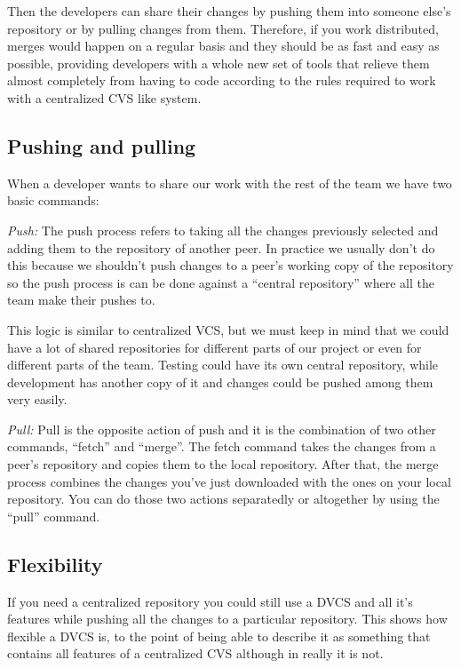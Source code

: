 \documentclass[a4paper,10pt]{article}
\begin{document}
Then the developers can share their changes by pushing them into someone else's repository or by pulling changes from them.
Therefore, if you work distributed, merges would happen on a regular basis and they should be as fast and easy as possible, providing developers with a whole new set of tools that relieve them almost completely from having to code according to the rules required to work with a centralized CVS like system. 

\subsection{Pushing and pulling}
When a developer wants to share our work with the rest of the team we have two basic commands:

\emph{Push:}
The push process refers to taking all the changes previously selected and adding them to the repository of another peer. In practice we usually don't do this because we shouldn't push changes to a peer's working copy of the repository so the push process is can be done against a ``central repository'' where all the team make their pushes to.

This logic is similar to centralized VCS, but we must keep in mind that we could have a lot of shared repositories for different parts of our project or even for different parts of the team. Testing could have its own central repository, while development has another copy of it and changes could be pushed among them very easily.

\emph{Pull:} 
Pull is the opposite action of push and it is the combination of two other commands, ``fetch'' and ``merge''. The fetch command takes the changes from a peer's repository and copies them to the local repository. After that, the merge process combines the changes you've just downloaded with the ones on your local repository. You can do those two actions separatedly or altogether by using the ``pull'' command.


\subsection{Flexibility}
If you need a centralized repository you could still use a DVCS and all it's features while pushing all the changes to a particular repository. This shows how flexible a DVCS is, to the point of being able to describe it as something that contains all features of a centralized CVS although in really it is not.
\end{document}
